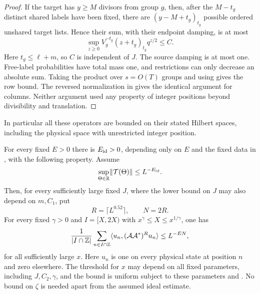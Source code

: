 \begin{proof}
If the target has $y\ge M$ divisors from group $g$, then, after
the $M-t_g$ distinct shared labels have been fixed, there are
$(y-M+t_g)_{t_g}$ possible ordered unshared target lists.  Hence
their sum, with their endpoint damping, is at most
\begin{equation}\label{eq:physical-count-bound}
 \sup_{z\ge0}V_g^{-t_g}(z+t_g)_{t_g}q^{z/2}\le C.
\end{equation}
Here $t_g\le\ell+m$, so $C$ is independent of $J$.  The source
damping is at most one.  Free-label probabilities have total mass
one, and restrictions can only decrease an absolute sum.
Taking the product over $s=O(T)$ groups and using
 gives the row bound.  The reversed
normalization in  gives the identical
argument for columns.  Neither argument used any property of
integer positions beyond divisibility and translation.
\end{proof}

In particular all these operators are bounded on their stated Hilbert
spaces, including the physical space with unrestricted integer position.

\begin{theorem}\label{thm:transference}
For every fixed $E>0$ there is $E_{\rm id}>0$, depending only on
$E$ and the fixed data in , with the following
property.  Assume
\begin{equation}\label{eq:ideal-norm-hypothesis}
 \sup_{\Theta\in\mathbb R}\lVert \mathcal T(\Theta)\rVert\le L^{-E_{\rm id}}.
\end{equation}
Then, for every sufficiently large fixed $J$, where the lower
bound on $J$ may also depend on $m,C_1$, put
\[
 R=\lceil L^{0.52}\rceil,\qquad N=2R.
\]
For every fixed $\gamma>0$ and $I=[X,2X)$ with
$x^\gamma\le X\le x^{1/\gamma}$, one has
\begin{equation}\label{eq:transference-moment}
 \frac1{|I\cap\mathbb Z|}\sum_{n\in I\cap\mathbb Z}
 \langle u_n,(\mathcal A\mathcal A^*)^Ru_n\rangle
 \le L^{-EN},
\end{equation}
for all sufficiently large $x$.  Here $u_n$ is one on every
physical state at position $n$ and zero elsewhere.  The threshold
for $x$ may depend on all fixed parameters, including $J,C_2,
\gamma$, and the bound is uniform subject to these parameters
and .  No bound on $\zeta$ is needed
apart from the assumed ideal estimate.
\end{theorem}

